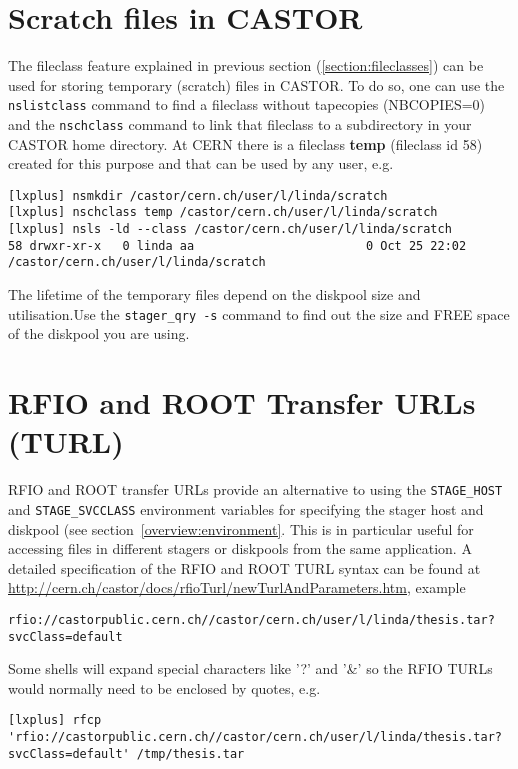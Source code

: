 \section{Scratch files in CASTOR}
The fileclass feature explained in previous section (\ref{section:fileclasses}) can be used for
storing temporary (scratch) files in CASTOR. To do so, one can use the {\tt nslistclass} command to find a 
fileclass without tapecopies (NBCOPIES=0) and the {\tt nschclass} command to link that fileclass to
a subdirectory in your CASTOR home directory. At CERN there is a fileclass {\bf temp} (fileclass id 58) created for this purpose and that can be used by any user, e.g.
\small
\begin{verbatim}
[lxplus] nsmkdir /castor/cern.ch/user/l/linda/scratch
[lxplus] nschclass temp /castor/cern.ch/user/l/linda/scratch
[lxplus] nsls -ld --class /castor/cern.ch/user/l/linda/scratch
58 drwxr-xr-x   0 linda aa                        0 Oct 25 22:02 /castor/cern.ch/user/l/linda/scratch
\end{verbatim}
\normalsize

The lifetime of the temporary files depend on the diskpool size and utilisation.Use the {\tt stager\_qry -s}
command to find out the size and FREE space of the diskpool you are using.

\section{RFIO and ROOT Transfer URLs (TURL)}
RFIO and ROOT transfer URLs provide an alternative to using the {\tt STAGE\_HOST} and
{\tt STAGE\_SVCCLASS} environment variables for specifying the stager host and diskpool
(see section~\ref{overview:environment}. This is in particular useful for accessing files in
different stagers or diskpools from the same application. A detailed specification of the
RFIO and ROOT TURL syntax can be found at
\url{http://cern.ch/castor/docs/rfioTurl/newTurlAndParameters.htm}, example
\small
\begin{verbatim}
rfio://castorpublic.cern.ch//castor/cern.ch/user/l/linda/thesis.tar?svcClass=default
\end{verbatim}
\normalsize

Some shells will expand special characters like '?' and '\&' so the RFIO TURLs would normally need
to be enclosed by quotes, e.g.
\small
\begin{verbatim}
[lxplus] rfcp 'rfio://castorpublic.cern.ch//castor/cern.ch/user/l/linda/thesis.tar?svcClass=default' /tmp/thesis.tar
\end{verbatim}
\normalsize

